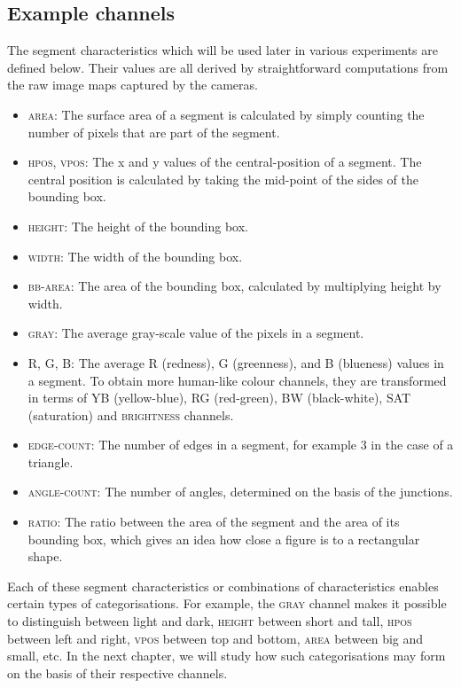 \subsection{Example channels}
\enlargethispage{1\baselineskip}
The segment characteristics which will be 
used later in various experiments are defined below. 
Their values are all derived by straightforward computations from 
the raw image maps captured by the cameras. 
\begin{itemize} 
\item \textsc{area}: The surface area of a segment
is calculated by simply counting the number of pixels that are part 
of the segment. 
\item \textsc{hpos}, \textsc{vpos}: The x and y values of the 
central-position of a segment. The central position 
is calculated by taking the mid-point of the sides 
of the bounding box. 
\item \textsc{height}: The height of the bounding box. 
\item \textsc{width}: The width of the bounding box. 
\item \textsc{bb-area}: The area of the bounding box,
calculated by multiplying height by width. 
\item \textsc{gray}: The average gray-scale value of the pixels
in a segment. 
\item R, G, B: The average R (redness), G
(greenness), and B (blueness) values in a
segment. To obtain more human-like colour channels, they are
transformed in terms of YB (yellow-blue), RG (red-green), 
BW (black-white), SAT (saturation) and \textsc{brightness} channels. 
\item \textsc{edge-count}: The number of edges in
a segment, for example 3 in the case of 
a triangle. 
\item \textsc{angle-count}: The number of angles, determined on the 
basis of the junctions. 
\item \textsc{ratio}: The ratio between the area of the segment 
and the area of its bounding box, which gives an idea how close 
a figure is to a rectangular shape. 
\end{itemize}

Each of these segment characteristics or combinations of
characteristics enables certain types of
categorisations. For example, the \textsc{gray} channel makes 
it possible to distinguish between 
light and dark, \textsc{height} between short and tall, \textsc{hpos} between 
left and right, \textsc{vpos} between top and bottom, 
\textsc{area} between big and small, etc. In the next chapter, we will study 
how such categorisations may 
form on the basis of their respective channels. 

